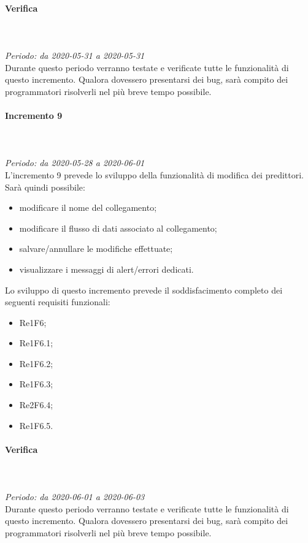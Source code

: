\paragraph*{Verifica}\mbox{} \\ \mbox{} \\ 
\textit{Periodo: da 2020-05-31 a 2020-05-31}\\
Durante questo periodo verranno testate e verificate tutte le funzionalità di questo incremento. Qualora dovessero presentarsi dei bug, sarà compito dei programmatori risolverli nel più breve tempo possibile.

\paragraph{Incremento 9}\mbox{} \\ \mbox{} \\ 
\textit{Periodo: da 2020-05-28 a 2020-06-01}\\
L’incremento 9 prevede lo sviluppo della funzionalità di modifica dei predittori. \\
Sarà quindi possibile:
\begin{itemize}
	\item modificare il nome del collegamento;
	\item modificare il flusso di dati associato al collegamento;
	\item salvare/annullare le modifiche effettuate;
	\item visualizzare i messaggi di alert/errori dedicati.
\end{itemize}
Lo sviluppo di questo incremento prevede il soddisfacimento completo dei seguenti requisiti funzionali:
\begin{itemize}
\item Re1F6;
\item Re1F6.1;
\item Re1F6.2;
\item Re1F6.3;
\item Re2F6.4;
\item Re1F6.5.
\end{itemize}
\paragraph*{Verifica}\mbox{} \\ \mbox{} \\ 
\textit{Periodo: da 2020-06-01 a 2020-06-03}\\
Durante questo periodo verranno testate e verificate tutte le funzionalità di questo incremento. Qualora dovessero presentarsi dei bug, sarà compito dei programmatori risolverli nel più breve tempo possibile.

